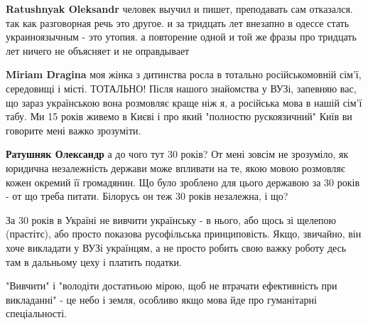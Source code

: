 \begin{itemize}
\begin{itemize}
\textbf{Ratushnyak Oleksandr} человек выучил и пишет, преподавать сам отказался. так как разговорная речь это другое. и за тридцать лет внезапно в одессе стать украиноязычным - это утопия. а повторение одной и той же фразы про тридцать лет ничего не объясняет и не оправдывает

 
\textbf{Miriam Dragina} моя жінка з дитинства росла в тотально російськомовній сім'ї, середовищі і місті. ТОТАЛЬНО! Після нашого знайомства у ВУЗі, запевняю вас, що зараз українською вона розмовляє краще ніж я, а російська мова в нашій сім'ї табу. Ми 15 років живемо в Києві і про який "полностю рускоязичний" Київ ви говорите мені важко зрозуміти.

 
\textbf{Ратушняк Олександр} а до чого тут 30 років? От мені зовсім не зрозуміло, як юридична незалежність держави може впливати на те, якою мовою розмовляє кожен окремий її громадянин. Що було зроблено для цього державою за 30 років - от що треба питати. Білорусь он теж 30 років незалежна, і що?

 

За 30 років в Україні не вивчити українську - в нього, або щось зі щелепою
(прастітє), або просто показова русофільська принциповість. Якщо, звичайно, він
хоче викладати у ВУЗі українцям, а не просто робить свою важку роботу десь там
в дальньому цеху і платить податки.


 

"Вивчити" і "володіти достатньою мірою, щоб не втрачати ефективність при
викладанні" - це небо і земля, особливо якщо мова йде про гуманітарні
спеціальності.



\end{itemize}
\end{itemize}

